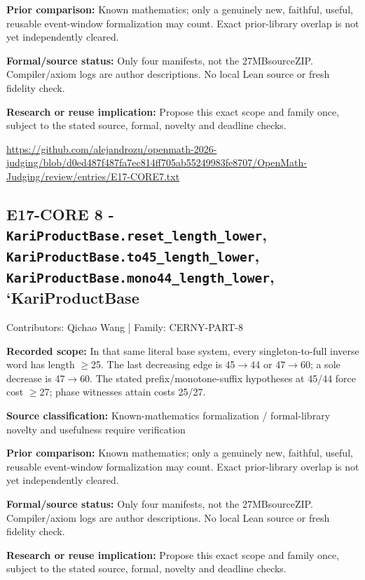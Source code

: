 \documentclass[11pt,a4paper]{article}
\begin{document}
\textbf{Prior comparison:} Known mathematics; only a genuinely new, faithful, useful, reusable event-window formalization may count. Exact prior-library overlap is not yet independently cleared.

\textbf{Formal/source status:} Only four manifests, not the 27MBsourceZIP. Compiler/axiom logs are author descriptions. No local Lean source or fresh fidelity check.

\textbf{Research or reuse implication:} Propose this exact scope and family once, subject to the stated source, formal, novelty and deadline checks.

{\small \url{https://github.com/alejandrozu/openmath-2026-judging/blob/d0ed487f487fa7ec814ff705ab55249983fe8707/OpenMath-Judging/review/entries/E17-CORE7.txt}\par}

\begin{samepage}
\subsection{E17-CORE 8  -  \texttt{KariProductBase.reset\_length\_lower}, \texttt{KariProductBase.to45\_length\_lower}, \texttt{KariProductBase.mono44\_length\_lower}, `KariProductBase}
{\small Contributors: Qichao Wang | Family: CERNY-PART-8\par}

\textbf{Recorded scope:} In that same literal base system, every singleton-to-full inverse word has length \ensuremath{\geq}25. The last decreasing edge is 45\ensuremath{\to}44 or 47\ensuremath{\to}60; a sole decrease is 47\ensuremath{\to}60. The stated prefix/monotone-suffix hypotheses at 45/44 force cost \ensuremath{\geq}27; phase witnesses attain costs 25/27.

\end{samepage}
\textbf{Source classification:} Known-mathematics formalization / formal-library novelty and usefulness require verification

\textbf{Prior comparison:} Known mathematics; only a genuinely new, faithful, useful, reusable event-window formalization may count. Exact prior-library overlap is not yet independently cleared.

\textbf{Formal/source status:} Only four manifests, not the 27MBsourceZIP. Compiler/axiom logs are author descriptions. No local Lean source or fresh fidelity check.

\textbf{Research or reuse implication:} Propose this exact scope and family once, subject to the stated source, formal, novelty and deadline checks.
\end{document}
